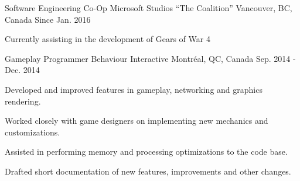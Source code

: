 

\begin{cventries}

  \cventry
    {Software Engineering Co-Op} %
    {Microsoft Studios ``The Coalition''} %
    {Vancouver, BC, Canada} %
    {Since Jan. 2016} %
    {
      \begin{cvitems} %
        \item {Currently assisting in the development of Gears of War 4}
        \\
      \end{cvitems}
    }

  \cventry
    {Gameplay Programmer} %
    {Behaviour Interactive} %
    {Montréal, QC, Canada} %
    {Sep. 2014 - Dec. 2014} %
    {
      \begin{cvitems} %
        \item {Developed and improved features in gameplay, networking and graphics rendering.}
        \item {Worked closely with game designers on implementing new mechanics and customizations.}
        \item {Assisted in performing memory and processing optimizations to the code base.}
        \item {Drafted short documentation of new features, improvements and other changes.}
        \\
      \end{cvitems}
    }

\end{cventries}
